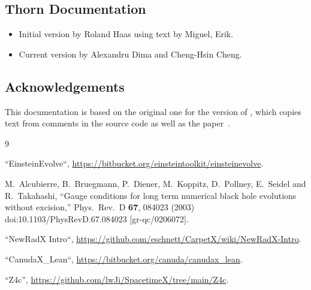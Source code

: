 \subsection{Thorn Documentation}
\begin{itemize}
\item Initial version by Roland Haas using text by Miguel, Erik.
\item Current version by Alexandru Dima and Cheng-Hsin Cheng.
\end{itemize}

\subsection{Acknowledgements}
This documentation is based on the original one for the  version
of , which copies text from comments in the source code as well
as the paper~\cite{SpacetimeX_NewRadX_Alcubierre:2002kk}.

\begin{thebibliography}{9}

 ``EinsteinEvolve``,
  \url{https://bitbucket.org/einsteintoolkit/einsteinevolve}.

  M.~Alcubierre, B.~Bruegmann, P.~Diener, M.~Koppitz, D.~Pollney, E.~Seidel and R.~Takahashi,
  ``Gauge conditions for long term numerical black hole evolutions without excision,''
  Phys.\ Rev.\ D {\bf 67}, 084023 (2003)
  doi:10.1103/PhysRevD.67.084023
  [gr-qc/0206072].

 ``NewRadX Intro``,
  \url{https://github.com/eschnett/CarpetX/wiki/NewRadX-Intro}.

 ``CanudaX\_Lean``,
  \url{https://bitbucket.org/canuda/canudax_lean}.

 ``Z4c'',
  \url{https://github.com/lwJi/SpacetimeX/tree/main/Z4c}.

\end{thebibliography}



